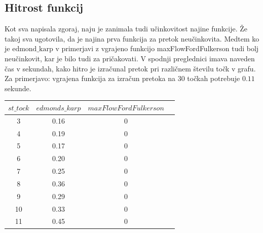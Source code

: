 \documentclass[a4paper]{article}
\begin{document}
\subsection{Hitrost funkcij}

Kot sva napisala zgoraj, naju je zanimala tudi učinkovitost najine funkcije. Že takoj sva ugotovila, da je najina prva funkcija za pretok neučinkovita. Medtem ko je $\text{edmond\_karp}$ v primerjavi z vgrajeno funkcijo maxFlowFordFulkerson tudi bolj neučinkovit, kar je bilo tudi za pričakovati. V spodnji preglednici imava naveden čas v sekundah, kako hitro je izračunal pretok pri različnem številu točk v grafu. Za primerjavo: vgrajena funkcija za izračun pretoka na 30 točkah potrebuje $0.11$ sekunde. 
\begin{center}
\begin{tabular}{ |c|c|c|c| } 
\hline
$st\_tock$ & $edmonds\_karp$ & $maxFlowFordFulkerson$ \\
\hline
3 & 0.16 & 0 \\ 
4 & 0.19 & 0 \\ 
5 & 0.17 & 0 \\ 
6 & 0.20 & 0 \\ 
7 & 0.25 & 0 \\ 
8 & 0.36 & 0 \\ 
9 & 0.29 & 0 \\ 
10 & 0.33 & 0 \\ 
11 & 0.45 & 0 \\ 
\hline
\end{tabular}
\end{center}
\end{document}
